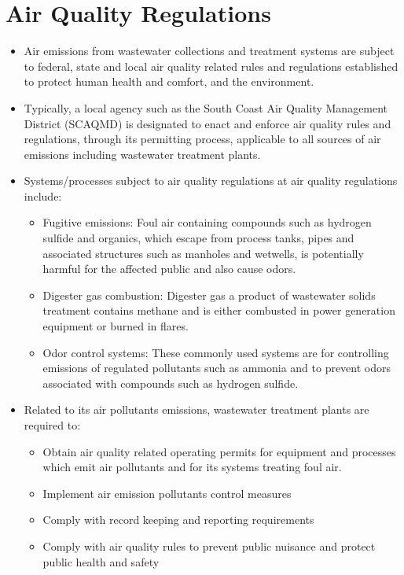 \section{Air Quality Regulations}
\begin{itemize}
\item Air emissions from wastewater collections and treatment systems are subject to federal, state and local air quality related rules and regulations established to protect human health and comfort, and the environment.  
\item Typically, a local agency such as the South Coast Air Quality Management District (SCAQMD) is designated to enact and enforce air quality rules and regulations, through its permitting process, applicable to all sources of air emissions including wastewater treatment plants.\\

\item Systems/processes subject to air quality regulations at air quality regulations include:

\begin{itemize}
\item Fugitive emissions:  Foul air containing compounds such as hydrogen sulfide and organics, which escape from process tanks, pipes and associated structures such as manholes and wetwells, is potentially harmful for the affected public and also cause odors.  
\item Digester gas combustion:  Digester gas a product of wastewater solids treatment contains methane and is either combusted in power generation equipment or burned in flares.
\item Odor control systems:  These commonly used systems are for controlling emissions of regulated pollutants such as ammonia and to prevent odors associated with compounds such as hydrogen sulfide.
\end{itemize}
 
\item Related to its air pollutants emissions, wastewater treatment plants are required to:
\begin{itemize}
\item Obtain air quality related operating permits for equipment and processes which emit air pollutants and for its systems treating foul air.
\item Implement air emission pollutants control measures
\item Comply with record keeping and reporting requirements
\item Comply with air quality rules to prevent public nuisance and protect public health and safety
\end{itemize}

\end{itemize}

